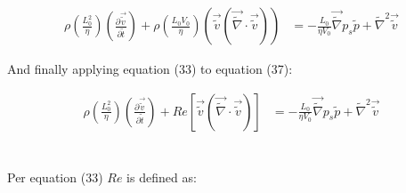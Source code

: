 \documentclass[titlepage]{article}
\begin{document}
\begin{align}
    \rho\left(\displaystyle\frac{L_{0}^2}{\eta}\right)\left(\displaystyle\frac{\partial{\vec{\tilde{v}}}}{\partial{\tilde{t}}}\right) + \rho\left(\displaystyle\frac{L_{0}V_{0}}{\eta}\right)\left(\vec{\tilde{v}}\left(\vec{\tilde{\nabla}}\cdot\vec{\tilde{v}}\right)\right) &= -\displaystyle\frac{L_{0}}{\eta{V_{0}}}\vec{\tilde{\nabla}}p_{s}\tilde{p} + \tilde{\nabla}^2\vec{\tilde{v}}
\end{align}


\noindent And finally applying equation (33) to equation (37): 

\begin{align}
    \rho\left(\displaystyle\frac{L_{0}^2}{\eta}\right)\left(\displaystyle\frac{\partial{\vec{\tilde{v}}}}{\partial{\tilde{t}}}\right) + Re\left[\vec{\tilde{v}}\left(\vec{\tilde{\nabla}}\cdot\vec{\tilde{v}}\right)\right] &= -\displaystyle\frac{L_{0}}{\eta{V_{0}}}\vec{\tilde{\nabla}}p_{s}\tilde{p} + \tilde{\nabla}^2\vec{\tilde{v}}
\end{align}

\newpage
\section{}
\indent Per equation (33) $Re$ is defined as: 
\end{document}
